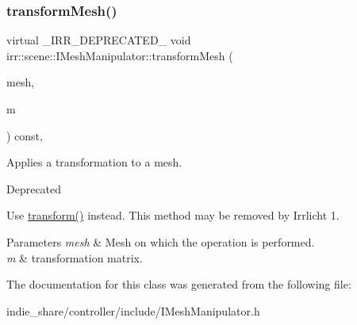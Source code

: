 \subsubsection{\texorpdfstring{transform\+Mesh()}{transformMesh()}}
{\footnotesize\ttfamily virtual \+\_\+\+I\+R\+R\+\_\+\+D\+E\+P\+R\+E\+C\+A\+T\+E\+D\+\_\+ void irr\+::scene\+::\+I\+Mesh\+Manipulator\+::transform\+Mesh (\begin{DoxyParamCaption}\item[{\hyperlink{classirr_1_1scene_1_1IMesh}{I\+Mesh} $\ast$}]{mesh,  }\item[{const \hyperlink{namespaceirr_1_1core_a73fa92e638c5ca97efd72da307cc9b65}{core\+::matrix4} \&}]{m }\end{DoxyParamCaption}) const\hspace{0.3cm}{\ttfamily [inline]}, {\ttfamily [virtual]}}



Applies a transformation to a mesh. 

\begin{DoxyRefDesc}{Deprecated}
\item[\hyperlink{deprecated__deprecated000015}{Deprecated}]Use \hyperlink{classirr_1_1scene_1_1IMeshManipulator_a9f9962d31cbd4ebeb1be0812765884cf}{transform()} instead. This method may be removed by Irrlicht 1. \end{DoxyRefDesc}

\begin{DoxyParams}{Parameters}
{\em mesh} & Mesh on which the operation is performed. \\
\hline
{\em m} & transformation matrix. \\
\hline
\end{DoxyParams}


The documentation for this class was generated from the following file\+:\begin{DoxyCompactItemize}
\item 
indie\+\_\+share/controller/include/I\+Mesh\+Manipulator.\+h\end{DoxyCompactItemize}
